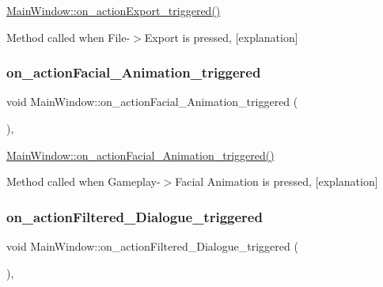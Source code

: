 \hyperlink{class_main_window_a7df050ed9d3ca5f73a3ed852b35fc736}{Main\+Window\+::on\+\_\+action\+Export\+\_\+triggered()} 

Method called when File-\/$>$Export is pressed, \mbox{[}explanation\mbox{]} \mbox{\label{class_main_window_a3680a8291f643a15e4373b92556c031f}} 
\subsubsection{\texorpdfstring{on\+\_\+action\+Facial\+\_\+\+Animation\+\_\+triggered}{on\_actionFacial\_Animation\_triggered}}
{\footnotesize\ttfamily void Main\+Window\+::on\+\_\+action\+Facial\+\_\+\+Animation\+\_\+triggered (\begin{DoxyParamCaption}{ }\end{DoxyParamCaption})\hspace{0.3cm}{\ttfamily [private]}, {\ttfamily [slot]}}



\hyperlink{class_main_window_a3680a8291f643a15e4373b92556c031f}{Main\+Window\+::on\+\_\+action\+Facial\+\_\+\+Animation\+\_\+triggered()} 

Method called when Gameplay-\/$>$Facial Animation is pressed, \mbox{[}explanation\mbox{]} \mbox{\label{class_main_window_a854ffd157a8571cc473a10628cf1967a}} 
\subsubsection{\texorpdfstring{on\+\_\+action\+Filtered\+\_\+\+Dialogue\+\_\+triggered}{on\_actionFiltered\_Dialogue\_triggered}}
{\footnotesize\ttfamily void Main\+Window\+::on\+\_\+action\+Filtered\+\_\+\+Dialogue\+\_\+triggered (\begin{DoxyParamCaption}{ }\end{DoxyParamCaption})\hspace{0.3cm}{\ttfamily [private]}, {\ttfamily [slot]}}



